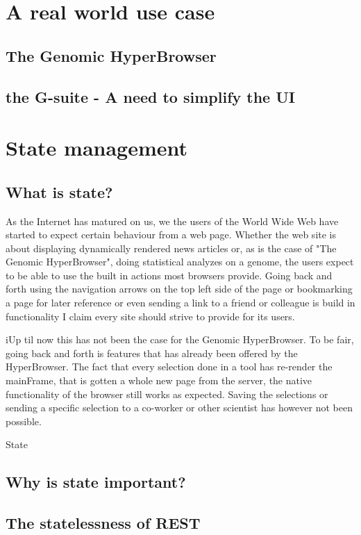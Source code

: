 \documentclass[english]{ifimaster}
\begin{document}
\section{A real world use case}
\subsection{The Genomic HyperBrowser}
\subsection{the G-suite - A need to simplify the UI}
\section{State management}
\subsection{What is state?}

As the Internet has matured on us, we the users of the World Wide Web have started to expect certain behaviour from a web page\parencite[p.85]{mikowski}. Whether the web site is about displaying dynamically rendered news articles or, as is the case of "The Genomic HyperBrowser", doing statistical analyzes on a genome, the users expect to be able to use the built in actions most browsers provide. Going back and forth using the navigation arrows on the top left side of the page or bookmarking a page for later reference or even sending a link to a friend or colleague is build in functionality I claim every site should strive to provide for its users. \newline

\noindent iUp til now this has not been the case for the Genomic HyperBrowser. To be fair, going back and forth is features that has already been offered by the HyperBrowser. The fact that every selection done in a tool has re-render the mainFrame, that is gotten a whole new page from the server, the native functionality of the browser still works as expected. Saving the selections or sending a specific selection to a co-worker or other scientist has however not been possible.

State

\subsection{Why is state important?}

\subsection{The statelessness of REST}
\end{document}
